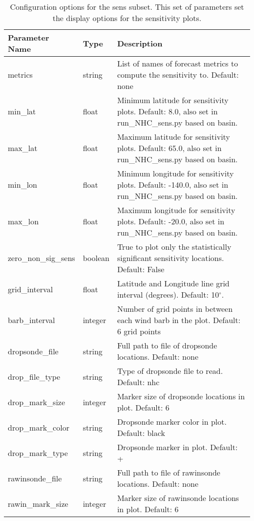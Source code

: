\documentclass[psfig,12pt]{article}
\begin{document}
\begin{table}[H]
\caption{Configuration options for the sens subset.  This set of parameters set the display options
for the sensitivity plots.}
\begin{center}
\begin{tabular}{|p{1.60in}|p{0.5in}|p{4.15in}|}
\hline
Parameter Name & Type & Description \\  \hline \hline
metrics & string & List of names of forecast metrics to compute the sensitivity to.  Default:  none \\ \hline
min\_lat & float & Minimum latitude for sensitivity plots.  Default:  8.0, also set in
run\_NHC\_sens.py based on basin.  \\ \hline
max\_lat & float & Maximum latitude for sensitivity plots.  Default:  65.0, also set in
run\_NHC\_sens.py based on basin.  \\ \hline
min\_lon & float & Minimum longitude for sensitivity plots.  Default:  -140.0, also set in 
run\_NHC\_sens.py based on basin.  \\ \hline
max\_lon & float & Maximum longitude for sensitivity plots.  Default:  -20.0, also set in
run\_NHC\_sens.py based on basin.  \\ \hline
zero\_non\_sig\_sens & boolean & True to plot only the statistically significant 
sensitivity locations.  Default:  False   \\ \hline
grid\_interval & float & Latitude and Longitude line grid interval (degrees).  Default:  10$^{\circ}$.  \\ \hline
barb\_interval & integer & Number of grid points in between each wind barb in the plot.
Default:  6 grid points  \\ \hline
dropsonde\_file & string & Full path to file of dropsonde locations.  Default:  none \\ \hline
drop\_file\_type & string & Type of dropsonde file to read. Default: nhc \\ \hline
drop\_mark\_size & integer &  Marker size of dropsonde locations in plot.  Default:  6 \\ \hline
drop\_mark\_color & string & Dropsonde marker color in plot.  Default: black \\ \hline
drop\_mark\_type & string & Dropsonde marker in plot.  Default: + \\ \hline
rawinsonde\_file & string & Full path to file of rawinsonde locations.  Default:  none \\ \hline
rawin\_mark\_size & integer & Marker size of rawinsonde locations in plot.  Default:  6 \\ \hline

\end{tabular}
\end{center}
\end{table}
\end{document}
